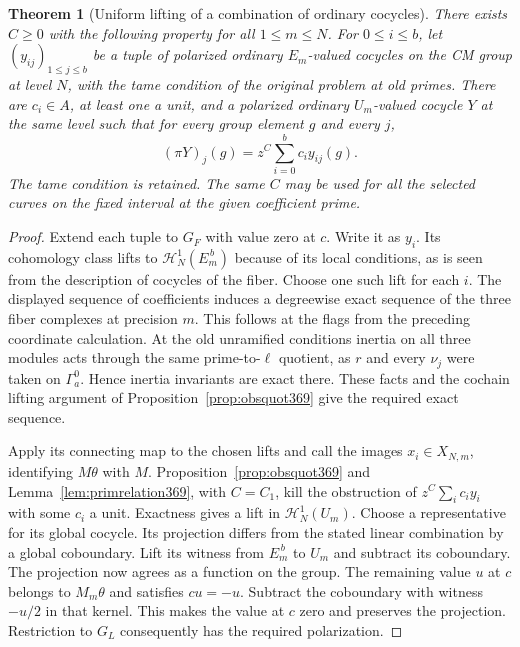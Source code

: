 \documentclass[a4paper,11pt]{article}
\newtheorem{theorem}[proposition]{Theorem}
\theoremstyle{definition}
\theoremstyle{remark}
\numberwithin{equation}{section}
\begin{document}
\begin{theorem}[Uniform lifting of a combination of ordinary cocycles]
\label{thm:selmerlift369}
There exists \(C\ge0\) with the following property for all
\(1\le m\le N\). For \(0\le i\le b\), let
\((y_{ij})_{1\le j\le b}\) be a tuple of polarized ordinary
\(E_m\)-valued cocycles on the CM group at level \(N\), with
the tame condition of the original problem at old primes.
There are \(c_i\in A\), at least one a unit, and a polarized
ordinary \(U_m\)-valued cocycle \(Y\) at the same level such
that for every group element \(g\) and every \(j\),
\[
                (\pi Y)_j(g)=z^C\sum_{i=0}^b c_i y_{ij}(g).
\]
The tame condition is retained. The same \(C\) may be used
for all the selected curves on the fixed interval at the
given coefficient prime.
\end{theorem}
\begin{proof}
Extend each tuple to \(G_F\) with value zero at \(c\). Write
it as \(y_i\). Its cohomology class lifts to
\(\mathcal H^1_N(E_m^{\,b})\) because of its local conditions,
as is seen from the description of cocycles of the fiber.
Choose one such lift for each \(i\). The displayed sequence
of coefficients induces a degreewise exact sequence of the
three fiber complexes at precision \(m\). This follows at
the flags from the preceding coordinate calculation. At
the old unramified conditions inertia on all three modules
acts through the same prime-to-\(\ell\) quotient, as \(r\)
and every \(\nu_j\) were taken on \(\Gamma_a^0\). Hence
inertia invariants are exact there. These facts and the
cochain lifting argument of Proposition~\ref{prop:obsquot369}
give the required exact sequence.

Apply its connecting map to the chosen lifts and call the
images \(x_i\in X_{N,m}\), identifying \(M\theta\) with \(M\).
Proposition~\ref{prop:obsquot369} and
Lemma~\ref{lem:primrelation369}, with \(C=C_1\), kill the
obstruction of \(z^C\sum_i c_i y_i\) with some \(c_i\) a unit.
Exactness gives a lift in \(\mathcal H^1_N(U_m)\).
Choose a representative for its global cocycle. Its projection
differs from the stated linear combination by a global
coboundary. Lift its witness from \(E_m^{\,b}\) to \(U_m\)
and subtract its coboundary. The projection now agrees as
a function on the group. The remaining value \(u\) at \(c\)
belongs to \(M_m\theta\) and satisfies \(cu=-u\). Subtract
the coboundary with witness \(-u/2\) in that kernel. This
makes the value at \(c\) zero and preserves the projection.
Restriction to \(G_L\) consequently has the required
polarization.


\end{proof}
\end{document}
